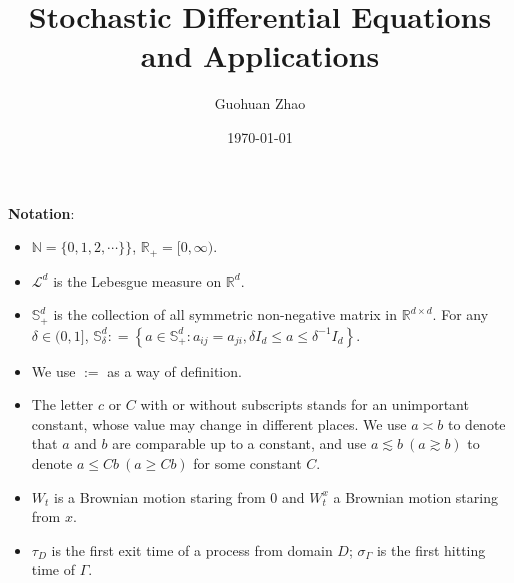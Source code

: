 \documentclass[twoside, 12pt]{book}
\numberwithin{equation}{chapter}
\def\mN{{\mathbb N}}
\def\mR{{\mathbb R}}
\def\mS{{\mathbb S}}
\def\sL{{\mathscr L}}
\def\l{\left}
\def\r{\right}
\def\geq{\geqslant}
\def\leq{\leqslant}
\begin{document}
	
	\title{Stochastic Differential Equations and Applications}
	
	\author{Guohuan Zhao}
	\date{\today}
	
	\maketitle
	\tableofcontents
	
	\newpage 
	
	{\bf Notation}: 
	\begin{itemize}
		\item $\mN=\{0,1,2,\cdots\}\}$, $\mR_+=[0,\infty)$. 
		\item $\sL^d$ is the Lebesgue measure on $\mR^d$. 
		\item $\mS^d_+$ is the collection of all symmetric non-negative matrix in $\mR^{d\times d}$. For any $\delta\in (0,1]$, $\mS_\delta^d : = \l\{a\in \mS^d_+: a_{ij}=a_{ji}, \delta I_d \leq a \leq \delta^{-1} I_d \r\}$. 
		\item We use $:=$ as a way of definition. 
		\item The letter $c$ or $C$ with or without subscripts stands for an unimportant constant, whose value may change in different places. We use $a \asymp b$ to denote that $a$ and $b$ are comparable up to a constant, and use $a\lesssim b~(a\gtrsim b)$ to denote $a\leq Cb~(a\geq Cb)$ for some constant $C$.
		\item $W_t$ is a Brownian motion staring from $0$ and $W_t^x$ a Brownian motion staring from $x$.
  \item $\tau_D$ is the first exit time of a process from domain $D$; $\sigma_\Gamma$ is the first hitting time of $\Gamma$.  
	\end{itemize}
	
\end{document}
